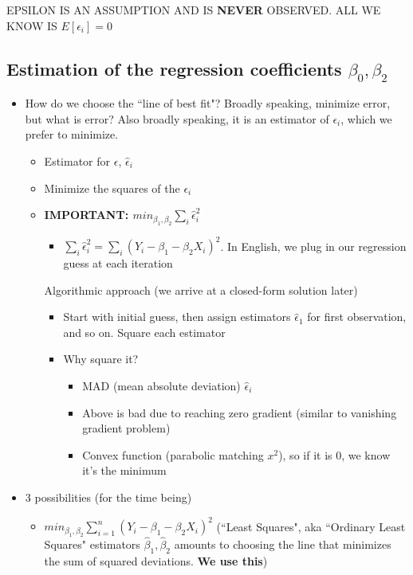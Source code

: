 \documentclass[10pt, oneside]{article}
\begin{document}
EPSILON IS AN ASSUMPTION AND IS \textbf{NEVER} OBSERVED. ALL WE KNOW IS $E[\epsilon_i] = 0$

\subsection{Estimation of the regression coefficients $\beta_0, \beta_2$}
\begin{itemize}
    \item How do we choose the ``line of best fit"? Broadly speaking, minimize error, but what is error? Also broadly speaking, it is an estimator of $\epsilon_i$, which we prefer to minimize.
    \begin{itemize}
        \item Estimator for $\epsilon$, $\hat \epsilon_i$
        \item Minimize the squares of the $\epsilon_i$
        \item \textbf{IMPORTANT: $min_{\beta_1, \beta_2} \sum _{i} \hat \epsilon_i ^2  $}
        \begin{itemize}
            \item $\sum _{i} \hat \epsilon_i ^2 =\sum_i (Y_i -\beta_1 -\beta_2 X_i)^2$. In English, we plug in our regression guess at each iteration
        \end{itemize}
        Algorithmic approach (we arrive at a closed-form solution later)
        \begin{itemize}
            \item Start with initial guess, then assign estimators $\hat \epsilon_1$ for first observation, and so on. Square each estimator
            \item Why square it?
            \begin{itemize}
                \item MAD (mean absolute deviation) $\hat \epsilon_i$
                \item Above is bad due to reaching zero gradient (similar to vanishing gradient problem)
                \item Convex function (parabolic matching $x^2$), so if it is 0, we know it's the minimum
            \end{itemize}
        \end{itemize}
    \end{itemize}
    \item 3 possibilities (for the time being)
    \begin{itemize}
        \item $min_{\beta_1, \beta_2} \sum ^n _{i=1} (Y_i - \beta_1 -\beta_2 X_i)^2$ (``Least Squares", aka ``Ordinary Least Squares" estimators $\hat \beta_1, \hat \beta_2$ amounts to choosing the line that minimizes the sum of squared deviations. \textbf{We use this})

\end{itemize}
\end{itemize}
\end{document}
